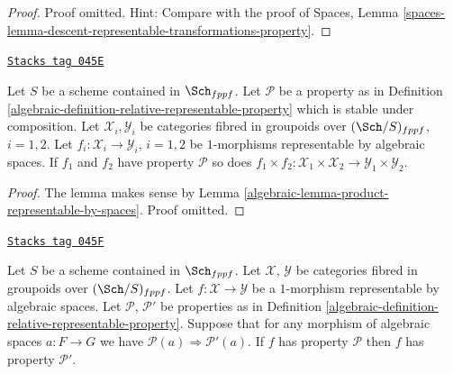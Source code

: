 \begin{proof}
Proof omitted. Hint: Compare with the proof of
Spaces,
Lemma \ref{spaces-lemma-descent-representable-transformations-property}.
\end{proof}

\begin{lemma}
\label{algebraic-lemma-product-representable-transformations-property}
\href{https://stacks.math.columbia.edu/tag/045E}{\texttt{Stacks tag 045E}}

Let $S$ be a scheme contained in $\Sch_{fppf}$.
Let $\mathcal{P}$ be a property as in
Definition \ref{algebraic-definition-relative-representable-property}
which is stable under composition.
Let $\mathcal{X}_i, \mathcal{Y}_i$ be categories fibred in groupoids over
$(\Sch/S)_{fppf}$, $i = 1, 2$.
Let $f_i : \mathcal{X}_i \to \mathcal{Y}_i$, $i = 1, 2$
be $1$-morphisms representable by algebraic spaces.
If $f_1$ and $f_2$ have property $\mathcal{P}$ so does
$
f_1 \times f_2 :
\mathcal{X}_1 \times \mathcal{X}_2
\to
\mathcal{Y}_1 \times \mathcal{Y}_2
$.
\end{lemma}

\begin{proof}

The lemma makes sense by
Lemma \ref{algebraic-lemma-product-representable-by-spaces}.
Proof omitted.
\end{proof}

\begin{lemma}
\label{algebraic-lemma-representable-transformations-property-implication}
\href{https://stacks.math.columbia.edu/tag/045F}{\texttt{Stacks tag 045F}}

Let $S$ be a scheme contained in $\Sch_{fppf}$.
Let $\mathcal{X}$, $\mathcal{Y}$ be categories fibred in groupoids
over $(\Sch/S)_{fppf}$.
Let $f : \mathcal{X} \to \mathcal{Y}$ be a $1$-morphism representable
by algebraic spaces.
Let $\mathcal{P}$, $\mathcal{P}'$ be properties as in
Definition \ref{algebraic-definition-relative-representable-property}.
Suppose that for any morphism of algebraic spaces $a : F \to G$
we have $\mathcal{P}(a) \Rightarrow \mathcal{P}'(a)$.
If $f$ has property $\mathcal{P}$ then
$f$ has property $\mathcal{P}'$.
\end{lemma}

